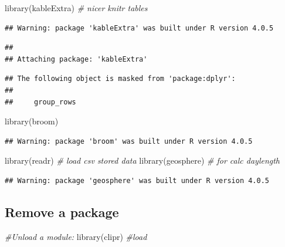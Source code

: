 \documentclass[
]{article}
\newenvironment{Shaded}{\begin{snugshade}}{\end{snugshade}}
\newcommand{\CommentTok}[1]{\textcolor[rgb]{0.56,0.35,0.01}{\textit{#1}}}
\newcommand{\FunctionTok}[1]{\textcolor[rgb]{0.00,0.00,0.00}{#1}}
\newcommand{\NormalTok}[1]{#1}
\begin{document}
\begin{Shaded}
\begin{Highlighting}[]
\FunctionTok{library}\NormalTok{(kableExtra) }\CommentTok{\# nicer knitr tables}
\end{Highlighting}
\end{Shaded}

\begin{verbatim}
## Warning: package 'kableExtra' was built under R version 4.0.5
\end{verbatim}

\begin{verbatim}
## 
## Attaching package: 'kableExtra'
\end{verbatim}

\begin{verbatim}
## The following object is masked from 'package:dplyr':
## 
##     group_rows
\end{verbatim}

\begin{Shaded}
\begin{Highlighting}[]
\FunctionTok{library}\NormalTok{(broom)}
\end{Highlighting}
\end{Shaded}

\begin{verbatim}
## Warning: package 'broom' was built under R version 4.0.5
\end{verbatim}

\begin{Shaded}
\begin{Highlighting}[]
\FunctionTok{library}\NormalTok{(readr) }\CommentTok{\# load csv stored data}
\FunctionTok{library}\NormalTok{(geosphere) }\CommentTok{\# for calc daylength}
\end{Highlighting}
\end{Shaded}

\begin{verbatim}
## Warning: package 'geosphere' was built under R version 4.0.5
\end{verbatim}

\hypertarget{remove-a-package}{%
\subsection{Remove a package}\label{remove-a-package}}

\begin{Shaded}
\begin{Highlighting}[]
\CommentTok{\#Unload a module: }
\FunctionTok{library}\NormalTok{(clipr) }\CommentTok{\#load}
\end{Highlighting}
\end{Shaded}
\end{document}
